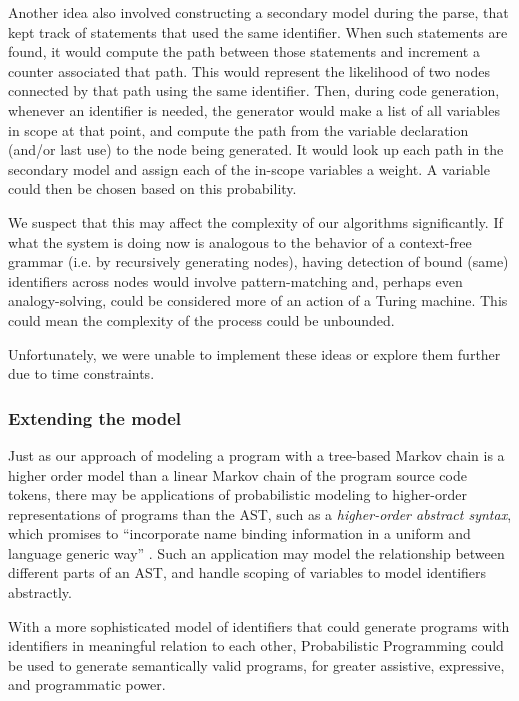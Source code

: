 \documentclass{article}
\begin{document}
Another idea also involved constructing a secondary model during the parse, that kept track of statements that used the same identifier. When such statements are found, it would compute the path between those statements and increment a counter associated that path. This would represent the likelihood of two nodes connected by that path using the same identifier. Then, during code generation, whenever an identifier is needed, the generator would make a list of all variables in scope at that point, and compute the path from the variable declaration (and/or last use) to the node being generated. It would look up each path in the secondary model and assign each of the in-scope variables a weight. A variable could then be chosen based on this probability.

We suspect that this may affect the complexity of our algorithms significantly. If what the system is doing now is analogous to the behavior of a context-free grammar (i.e. by recursively generating nodes), having detection of bound (same) identifiers across nodes would involve pattern-matching and, perhaps even analogy-solving, could be considered more of an action of a Turing machine. This could mean the complexity of the process could be unbounded.

Unfortunately, we were unable to implement these ideas or explore them further due to time constraints.

\subsubsection{Extending the model}

Just as our approach of modeling a program with a tree-based Markov chain is a
higher order model than a linear Markov chain of the program source code tokens,
there may be applications of probabilistic modeling to higher-order
representations of programs than the AST, such as a \emph{higher-order abstract syntax}, which promises to ``incorporate name binding information in a uniform and language generic way'' \cite{hosa}. Such an application may model the relationship between different
parts of an AST, and handle scoping of variables to model identifiers
abstractly.

With a more sophisticated model of identifiers that could generate programs with
identifiers in meaningful relation to each other, Probabilistic Programming could
be used to generate semantically valid programs, for greater assistive,
expressive, and programmatic power.
\end{document}
